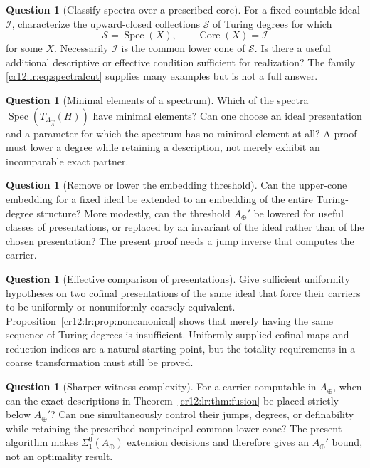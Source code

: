\documentclass[11pt,letterpaper]{article}
\theoremstyle{plain}
\theoremstyle{definition}
\newtheorem{question}[theorem]{Question}
\theoremstyle{remark}
\numberwithin{equation}{section}
\newcommand{\Core}{\operatorname{Core}}
\newcommand{\Spec}{\operatorname{Spec}}
\newcommand{\I}{\mathcal I}
\newcommand{\Aplus}{A_{\oplus}}          %
\newcommand{\Lam}{\Lambda_{\vec A}}      %
\begin{document}
\begin{question}[Classify spectra over a prescribed core]\label{cr12:lr:q:spectra}
For a fixed countable ideal $\I$, characterize the upward-closed collections
$\mathcal S$ of Turing degrees for which
\[
 \mathcal S=\Spec(X),\qquad \Core(X)=\I
\]
for some $X$. Necessarily $\I$ is the common lower cone of $\mathcal S$. Is there a
useful additional descriptive or effective condition sufficient for realization? The
family \eqref{cr12:lr:eq:spectralcut} supplies many examples but is not a full answer.
\end{question}

\begin{question}[Minimal elements of a spectrum]\label{cr12:lr:q:minimal}
Which of the spectra $\Spec(T_{\Lam}(H))$ have minimal elements? Can one choose an ideal
presentation and a parameter for which the spectrum has no minimal element at all? A
proof must lower a degree while retaining a description, not merely exhibit an
incomparable exact partner.
\end{question}

\begin{question}[Remove or lower the embedding threshold]\label{cr12:lr:q:threshold}
Can the upper-cone embedding for a fixed ideal be extended to an embedding of the
entire Turing-degree structure? More modestly, can the threshold $\Aplus'$ be lowered
for useful classes of presentations, or replaced by an invariant of the ideal rather
than of the chosen presentation? The present proof needs a jump inverse that computes
the carrier.
\end{question}

\begin{question}[Effective comparison of presentations]\label{cr12:lr:q:presentations}
Give sufficient uniformity hypotheses on two cofinal presentations of the same ideal
that force their carriers to be uniformly or nonuniformly coarsely equivalent.
Proposition~\ref{cr12:lr:prop:noncanonical} shows that merely having the same sequence
of Turing degrees is insufficient. Uniformly supplied cofinal maps and reduction
indices are a natural starting point, but the totality requirements in a coarse
transformation must still be proved.
\end{question}

\begin{question}[Sharper witness complexity]\label{cr12:lr:q:witness}
For a carrier computable in $\Aplus$, when can the exact descriptions in
Theorem~\ref{cr12:lr:thm:fusion} be placed strictly below $\Aplus'$? Can one
simultaneously control their jumps, degrees, or definability while retaining the
prescribed nonprincipal common lower cone? The present algorithm makes
$\Sigma^0_1(\Aplus)$ extension decisions and therefore gives an $\Aplus'$ bound, not an
optimality result.
\end{question}
\end{document}
